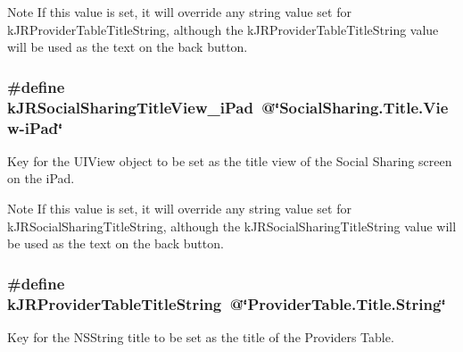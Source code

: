 \begin{DoxyNote}{Note}
If this value is set, it will override any string value set for kJRProviderTableTitleString, although the kJRProviderTableTitleString value will be used as the text on the back button. 
\end{DoxyNote}
\hypertarget{group__custom_interface_ga2f88062cdd1fd38ad0e800d382450398}{
\subsubsection[{kJRSocialSharingTitleView\_\-iPad}]{\setlength{\rightskip}{0pt plus 5cm}\#define kJRSocialSharingTitleView\_\-iPad~@\char`\"{}SocialSharing.Title.View-\/iPad\char`\"{}}}
\label{group__custom_interface_ga2f88062cdd1fd38ad0e800d382450398}
Key for the {\ttfamily UIView} object to be set as the title view of the Social Sharing screen on the iPad.

\begin{DoxyNote}{Note}
If this value is set, it will override any string value set for kJRSocialSharingTitleString, although the kJRSocialSharingTitleString value will be used as the text on the back button. 
\end{DoxyNote}
\hypertarget{group__custom_interface_gaf728e45125be9ca6fa515a39a77e7ce7}{
\subsubsection[{kJRProviderTableTitleString}]{\setlength{\rightskip}{0pt plus 5cm}\#define kJRProviderTableTitleString~@\char`\"{}ProviderTable.Title.String\char`\"{}}}
\label{group__custom_interface_gaf728e45125be9ca6fa515a39a77e7ce7}
Key for the {\ttfamily NSString} title to be set as the title of the Providers Table.

